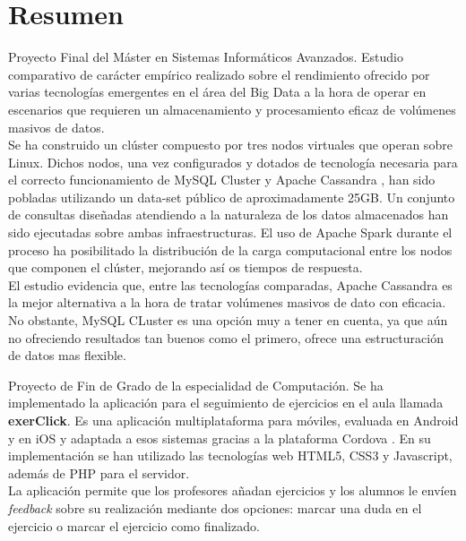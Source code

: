 \section*{Resumen}

Proyecto Final del Máster en Sistemas Informáticos Avanzados. Estudio comparativo de carácter empírico realizado sobre el rendimiento ofrecido por varias tecnologías emergentes en el área del Big Data a la hora de operar en escenarios que requieren un almacenamiento y procesamiento eficaz de volúmenes masivos de datos.\\

Se ha construido un clúster compuesto por tres nodos virtuales que operan sobre Linux. Dichos nodos, una vez configurados y dotados de tecnología necesaria para el correcto funcionamiento de MySQL Cluster \cite{mysqlcluster} y Apache Cassandra \cite{apachecassandra}, han sido pobladas utilizando un data-set público de aproximadamente 25GB. Un conjunto de consultas diseñadas atendiendo a la naturaleza de los datos almacenados han sido ejecutadas sobre ambas infraestructuras. El uso de Apache Spark \cite{apachespark} durante el proceso ha posibilitado la distribución de la carga computacional entre los nodos que componen el clúster, mejorando así os tiempos de respuesta.\\

El estudio evidencia que, entre las tecnologías comparadas, Apache Cassandra es la mejor alternativa a la hora de tratar volúmenes masivos de dato con eficacia. No obstante, MySQL CLuster es una opción muy a tener en cuenta, ya que aún no ofreciendo resultados tan buenos como el primero, ofrece una estructuración de datos mas flexible.









Proyecto de Fin de Grado de la especialidad de Computación. Se ha implementado la aplicación para el seguimiento de ejercicios en el aula llamada \textbf{exerClick}. Es una aplicación multiplataforma para móviles, evaluada en Android y en iOS y adaptada a esos sistemas gracias a la plataforma Cordova \cite{apachecordova}. En su implementación se han utilizado las tecnologías web HTML5, CSS3 y Javascript, además de PHP para el servidor.\\

La aplicación permite que los profesores añadan ejercicios y los alumnos le envíen \textit{feedback} sobre su realización mediante dos opciones: marcar una duda en el ejercicio o marcar el ejercicio como finalizado.\\

